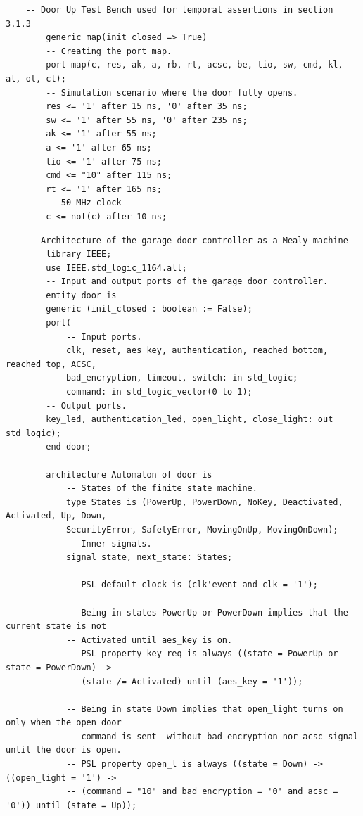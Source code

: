 \documentclass[a4paper,11pt]{article}
\begin{document}
    \begin{verbatim}
    -- Door Up Test Bench used for temporal assertions in section 3.1.3
        generic map(init_closed => True)
        -- Creating the port map.
        port map(c, res, ak, a, rb, rt, acsc, be, tio, sw, cmd, kl, al, ol, cl);
        -- Simulation scenario where the door fully opens.
        res <= '1' after 15 ns, '0' after 35 ns;
        sw <= '1' after 55 ns, '0' after 235 ns;
        ak <= '1' after 55 ns;
        a <= '1' after 65 ns;
        tio <= '1' after 75 ns;
        cmd <= "10" after 115 ns;
        rt <= '1' after 165 ns;
        -- 50 MHz clock
        c <= not(c) after 10 ns;
    \end{verbatim}
    
    \begin{verbatim}
    -- Architecture of the garage door controller as a Mealy machine
        library IEEE;
        use IEEE.std_logic_1164.all;
        -- Input and output ports of the garage door controller.
        entity door is
        generic (init_closed : boolean := False);
        port(
            -- Input ports.
            clk, reset, aes_key, authentication, reached_bottom, reached_top, ACSC,
            bad_encryption, timeout, switch: in std_logic;
            command: in std_logic_vector(0 to 1);
	    -- Output ports.
	    key_led, authentication_led, open_light, close_light: out std_logic);
        end door;

        architecture Automaton of door is
            -- States of the finite state machine.
            type States is (PowerUp, PowerDown, NoKey, Deactivated, Activated, Up, Down,
            SecurityError, SafetyError, MovingOnUp, MovingOnDown);
            -- Inner signals.
            signal state, next_state: States;
        
            -- PSL default clock is (clk'event and clk = '1');

            -- Being in states PowerUp or PowerDown implies that the current state is not
            -- Activated until aes_key is on.
            -- PSL property key_req is always ((state = PowerUp or state = PowerDown) ->
            -- (state /= Activated) until (aes_key = '1'));

            -- Being in state Down implies that open_light turns on only when the open_door
            -- command is sent  without bad encryption nor acsc signal until the door is open.
            -- PSL property open_l is always ((state = Down) -> ((open_light = '1') ->
            -- (command = "10" and bad_encryption = '0' and acsc = '0')) until (state = Up));


\end{verbatim}
\end{document}
